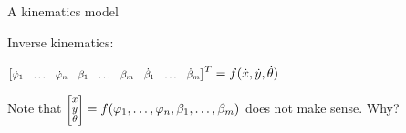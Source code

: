 \documentclass[compress]{beamer}
\newcommand{\colvec}[2][.8]{%
  \scalebox{#1}{%
    \renewcommand{\arraystretch}{.8}%
    $\begin{bmatrix}#2\end{bmatrix}$%
  }
}
\begin{document}
\begin{frame}{A kinematics model}
        \pause

    Inverse kinematics:

    $
        \colvec{\dot\varphi_1 & \ldots & \dot\varphi_n& \beta_1 & \ldots &
        \beta_m & \dot\beta_1 & \ldots & \dot\beta_m}^T = f(\dot{x},
        \dot{y},\dot\theta)
    $

Note that  $\colvec{x \\ y \\ \theta } =
        f(\varphi_1,\ldots,\varphi_n,\beta_1,\ldots,\beta_m)$ does not make sense. Why?


\end{frame}
\end{document}
